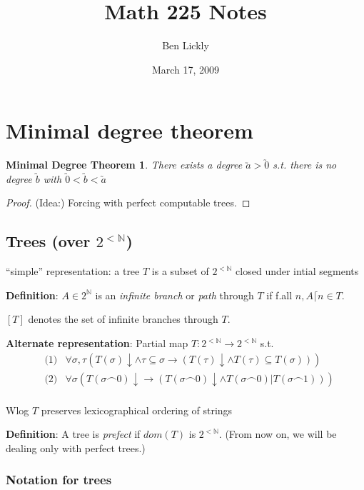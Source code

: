 \documentclass[12pt]{article}
\author{Ben Lickly}
\date{March 17, 2009}
\title{Math 225 Notes}
\newcommand{\Nat}{\ensuremath{\mathbb{N}}}
\newcommand{\defn}{\textbf{Definition}: }
\begin{document}
\maketitle

\section{Minimal degree theorem}

\newtheorem{mindeg}{Minimal Degree Theorem}
\begin{mindeg}
  There exists a degree $\utilde{a} > \utilde{0}$ s.t. 
  there is no degree $\utilde{b}$ with $\utilde{0} < \utilde{b} < \utilde{a}$
\end{mindeg}
\begin{proof}
  (Idea:) Forcing with perfect computable trees.
\end{proof}

\subsection{Trees
(over $2^{<\Nat}$)}

``simple'' representation:
a tree $T$ is a subset of $2^{<\Nat}$ closed under intial segments

\defn $A \in 2^\Nat$ is an \emph{infinite branch} or \emph{path} through $T$
if f.all $n, A \lceil n \in T$.

$[T]$ denotes the set of infinite branches through $T$.

\textbf{Alternate representation}:
Partial map $T: 2^{<\Nat} \rightarrow 2^{<\Nat}$ s.t.
\begin{align*}
  &\text{(1)}&
     \forall \sigma,\tau 
        \left(T(\sigma)\downarrow \wedge \tau \subseteq \sigma \rightarrow
             (T(\tau)\downarrow \wedge T(\tau) \subseteq T(\sigma)) \right) \\
  &\text{(2)}&
     \forall \sigma \left(T(\sigma \frown 0) \downarrow \rightarrow
        (T(\sigma \frown 0)\downarrow \wedge T(\sigma \frown 0) | %
                T(\sigma \frown 1)) \right) \\
\end{align*}

Wlog $T$ preserves lexicographical ordering of strings

\defn A tree is \emph{prefect} if $dom(T)$ is $2^{<\Nat}$.
(From now on, we will be dealing only with perfect trees.)

\subsubsection{Notation for trees}
\end{document}
